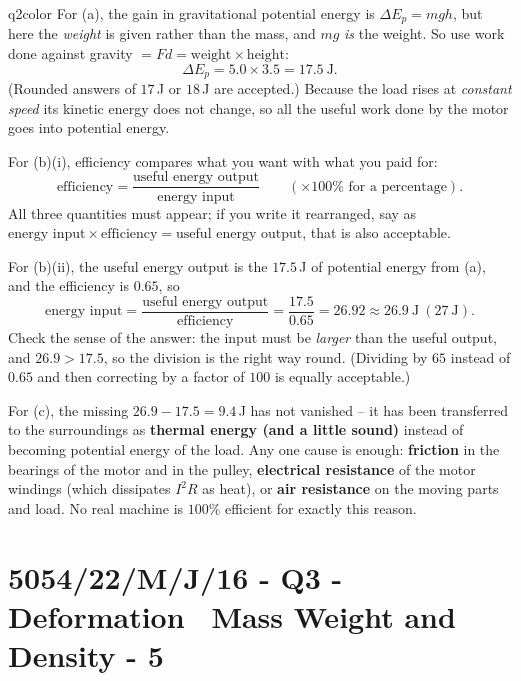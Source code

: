 \documentclass[11pt,a4paper]{article}
\newcommand{\examq}[4]{\section[#1 - Q#2]{#1 - Q#2 - #3 - #4}}
\begin{document}
\begin{ansbox}{q2color}
For (a), the gain in gravitational potential energy is $\Delta E_p = mgh$, but here the \emph{weight} is given rather than the mass, and $mg$ \emph{is} the weight. So use work done against gravity $= Fd = \text{weight} \times \text{height}$:
\[ \Delta E_p = 5.0 \times 3.5 = 17.5\ \mathrm{J}. \]
(Rounded answers of $17$\,J or $18$\,J are accepted.) Because the load rises at \emph{constant speed} its kinetic energy does not change, so all the useful work done by the motor goes into potential energy.

For (b)(i), efficiency compares what you want with what you paid for:
\[ \text{efficiency} = \frac{\text{useful energy output}}{\text{energy input}} \qquad \left(\times 100\% \text{ for a percentage}\right). \]
All three quantities must appear; if you write it rearranged, say as $\text{energy input} \times \text{efficiency} = \text{useful energy output}$, that is also acceptable.

For (b)(ii), the useful energy output is the $17.5$\,J of potential energy from (a), and the efficiency is $0.65$, so
\[ \text{energy input} = \frac{\text{useful energy output}}{\text{efficiency}} = \frac{17.5}{0.65} = 26.92 \approx 26.9\ \mathrm{J}\ (27\ \mathrm{J}). \]
Check the sense of the answer: the input must be \emph{larger} than the useful output, and $26.9 > 17.5$, so the division is the right way round. (Dividing by $65$ instead of $0.65$ and then correcting by a factor of $100$ is equally acceptable.)

For (c), the missing $26.9 - 17.5 = 9.4$\,J has not vanished -- it has been transferred to the surroundings as \textbf{thermal energy (and a little sound)} instead of becoming potential energy of the load. Any one cause is enough: \textbf{friction} in the bearings of the motor and in the pulley, \textbf{electrical resistance} of the motor windings (which dissipates $I^2R$ as heat), or \textbf{air resistance} on the moving parts and load. No real machine is $100\%$ efficient for exactly this reason.
\end{ansbox}

\examq{5054/22/M/J/16}{3}{Deformation \textperiodcentered\ Mass Weight and Density}{5}
\end{document}
